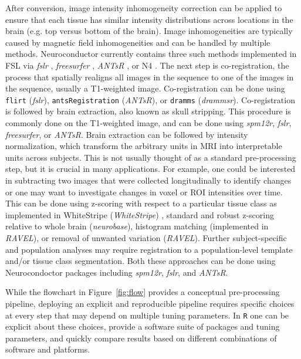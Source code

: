 \documentclass[]{elsarticle} %
\newcommand{\code}[1]{\texttt{#1}}
\newcommand{\pkg}[1]{\emph{#1}}
\begin{document}
After conversion, image intensity inhomogeneity correction can be applied to ensure that each tissue has similar intensity distributions across locations in the brain (e.g. top versus bottom of the brain). Image inhomogeneities are typically caused by magnetic field inhomogeneities and can be handled by multiple methods. Neuroconductor currently contains three such methods implemented in FSL  via \pkg{fslr} \cite{zhang_segmentation_2001},  \pkg{freesurfer} \cite{sled_nonparametric_1998}, \pkg{ANTsR} \cite{sled_nonparametric_1998}, or N4 \cite{tustison_n4itk:_2010}.  The next step is co-registration, the process that spatially realigns all images in the sequence to one of the images in the sequence, usually a T1-weighted image.  Co-registration can be done using \code{flirt} (\pkg{fslr}), \code{antsRegistration} (\pkg{ANTsR}), or \code{dramms} (\pkg{drammsr}). Co-registration is followed by brain extraction, also known as skull stripping.  This procedure is commonly done on the T1-weighted image, and can be done using \pkg{spm12r}, \pkg{fslr}, \pkg{freesurfer}, or \pkg{ANTsR}. Brain extraction can be followed by intensity normalization,  which transform the arbitrary units in MRI into interpretable units across subjects. This is not usually thought of as a standard pre-processing step, but it is crucial in many applications. For example, one could be interested in subtracting two images that were collected longitudinally to identify changes or one may want to investigate changes in voxel or ROI intensities over time.  This can be done using z-scoring with respect to a particular tissue class as implemented in WhiteStripe (\pkg{WhiteStripe}) \citep{whitestripe}, standard and robust z-scoring relative to whole brain (\pkg{neurobase}), histogram matching  (implemented in \pkg{RAVEL}), or removal of unwanted variation \citep{ravel} (\pkg{RAVEL}).  Further subject-specific and population analyses may require registration to a population-level template and/or tissue class segmentation. Both these approaches can be done using Neurocondoctor packages including \pkg{spm12r}, \pkg{fslr}, and \pkg{ANTsR}.

While the flowchart in Figure~\ref{fig:flow} provides a conceptual pre-processing pipeline, deploying an explicit and reproducible pipeline requires specific choices at every step that may depend on multiple tuning parameters. In \verb"R" one can be explicit about these choices, provide a software suite of packages and tuning parameters, and quickly compare results based on different combinations of software and platforms.  
\end{document}
